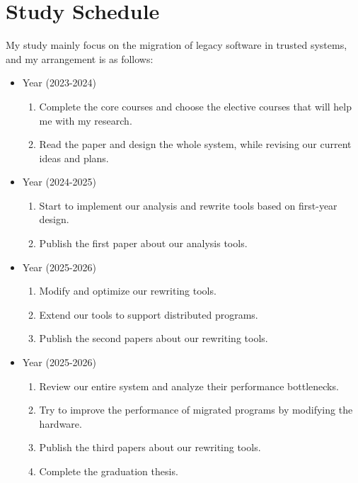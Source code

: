 \section{Study Schedule}
My study mainly focus on the migration of legacy software in trusted systems,
and my arrangement is as follows:

\begin{itemize}
    \item {} Year (2023-2024)
    \begin{enumerate}
        \item Complete the core courses and choose the elective courses
        that will help me with my research.
        \item Read the paper and design the whole system, while revising
        our current ideas and plans.
    \end{enumerate}
    \item {} Year (2024-2025)
        \begin{enumerate}
            \item Start to implement our analysis and rewrite tools based on
            first-year design.
            \item Publish the first paper about our analysis tools.
        \end{enumerate}
    \item {} Year (2025-2026)
        \begin{enumerate}
            \item Modify and optimize our rewriting tools.
            \item Extend our tools to support distributed programs.
            \item Publish the second papers about our rewriting tools.
        \end{enumerate}
    \item {} Year (2025-2026)
        \begin{enumerate}
            \item Review our entire system and analyze their performance bottlenecks.
            \item Try to improve the performance of migrated programs by
            modifying the hardware.
            \item Publish the third papers about our rewriting tools.
            \item Complete the graduation thesis.
        \end{enumerate}
\end{itemize}

